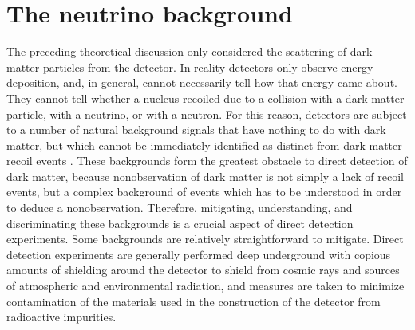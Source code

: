 \documentclass[b5paper, 10pt, twoside]{book}
\renewcommand{\vec}[1]{\symbfit{#1}}
\begin{document}



\chapter{The neutrino background}
\label{chap:background}

The preceding theoretical discussion only considered the scattering of dark matter particles from the detector. In reality detectors only observe energy deposition, and, in general, cannot necessarily tell how that energy came about. They cannot tell whether a nucleus recoiled due to a collision with a dark matter particle, with a neutrino, or with a neutron. For this reason, detectors are subject to a number of natural background signals that have nothing to do with dark matter, but which cannot be immediately identified as distinct from dark matter recoil events \parencite{BaxterEtAl2022}. These backgrounds form the greatest obstacle to direct detection of dark matter, because nonobservation of dark matter is not simply a lack of recoil events, but a complex background of events which has to be understood in order to deduce a nonobservation. Therefore, mitigating, understanding, and discriminating these backgrounds is a crucial aspect of direct detection experiments. Some backgrounds are relatively straightforward to mitigate. Direct detection experiments are generally performed deep underground with copious amounts of shielding around the detector to shield from cosmic rays and sources of atmospheric and environmental radiation, and measures are taken to minimize contamination of the materials used in the construction of the detector from radioactive impurities.
\end{document}
